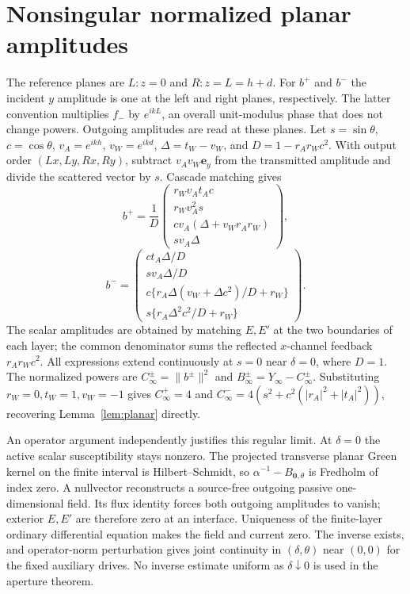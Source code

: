 \documentclass[11pt]{article}
\newcommand{\ey}{\mathbf e_y}
\newcommand{\norm}[1]{\lVert #1\rVert}
\newcommand{\abs}[1]{\lvert #1\rvert}
\begin{document}
\section{Nonsingular normalized planar amplitudes}\label{app:amplitudes}
The reference planes are $L:z=0$ and $R:z=L=h+d$. For $b^+$ and $b^-$ the incident $y$ amplitude is one at the left and right planes, respectively. The latter convention multiplies $f_-$ by $e^{ikL}$, an overall unit-modulus phase that does not change powers. Outgoing amplitudes are read at these planes. Let $s=\sin\theta$, $c=\cos\theta$, $v_A=e^{ikh}$, $v_W=e^{ikd}$, $\Delta=t_W-v_W$, and $D=1-r_Ar_Wc^2$. With output order $(Lx,Ly,Rx,Ry)$, subtract $v_Av_W\ey$ from the transmitted amplitude and divide the scattered vector by $s$. Cascade matching gives
\begin{equation}\label{eq:amplitudes-plus}
 b^+=\frac1D\begin{pmatrix}
 r_Wv_At_Ac\\r_Wv_A^2s\\cv_A(\Delta+v_Wr_Ar_W)\\sv_A\Delta
 \end{pmatrix},
\end{equation}
\begin{equation}\label{eq:amplitudes-minus}
 b^-=\begin{pmatrix}
 ct_A\Delta/D\\sv_A\Delta/D\\
 c\{r_A\Delta(v_W+\Delta c^2)/D+r_W\}\\
 s\{r_A\Delta^2c^2/D+r_W\}
 \end{pmatrix}.
\end{equation}
The scalar amplitudes are obtained by matching $E,E'$ at the two boundaries of each layer; the common denominator sums the reflected $x$-channel feedback $r_Ar_Wc^2$. All expressions extend continuously at $s=0$ near $\delta=0$, where $D=1$. The normalized powers are $C_\infty^\pm=\norm{b^\pm}^2$ and $B_\infty^\pm=Y_\infty-C_\infty^\pm$. Substituting $r_W=0,t_W=1,v_W=-1$ gives $C_\infty^+=4$ and $C_\infty^-=4(s^2+c^2(\abs{r_A}^2+\abs{t_A}^2))$, recovering Lemma~\ref{lem:planar} directly.

An operator argument independently justifies this regular limit. At $\delta=0$ the active scalar susceptibility stays nonzero. The projected transverse planar Green kernel on the finite interval is Hilbert--Schmidt, so $\alpha^{-1}-B_{\mathbf0,\theta}$ is Fredholm of index zero. A nullvector reconstructs a source-free outgoing passive one-dimensional field. Its flux identity forces both outgoing amplitudes to vanish; exterior $E,E'$ are therefore zero at an interface. Uniqueness of the finite-layer ordinary differential equation makes the field and current zero. The inverse exists, and operator-norm perturbation gives joint continuity in $(\delta,\theta)$ near $(0,0)$ for the fixed auxiliary drives. No inverse estimate uniform as $\delta\downarrow0$ is used in the aperture theorem.



\end{document}
